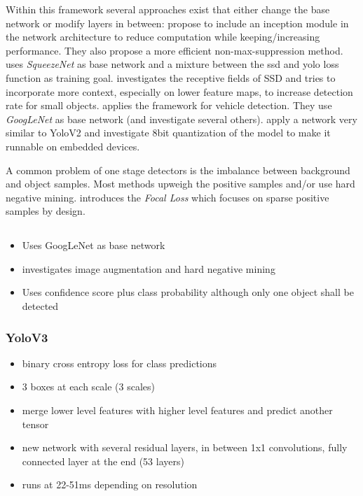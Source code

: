 	Within this framework several approaches exist that either change the base network or modify layers in between: \cite{ChengchengNing2017} propose to include an inception module in the network architecture to reduce computation while keeping/increasing performance. They also propose a more efficient non-max-suppression method. \cite{Wu} uses \textit{SqueezeNet} as base network and a mixture between the ssd and yolo loss function as training goal. \cite{Xiang} investigates the receptive fields of SSD and tries to incorporate more context, especially on lower feature maps, to increase detection rate for small objects.\cite{Linb} applies the framework for vehicle detection. They use \textit{GoogLeNet} as base network (and investigate several others).\cite{TripathiSanDiego} apply a network very similar to YoloV2 and investigate 8bit quantization of the model to make it runnable on embedded devices.
	
	A common problem of one stage detectors is the imbalance between background and object samples. Most methods upweigh the positive samples and/or use hard negative mining. \cite{Lin} introduces the \textit{Focal Loss} which focuses on sparse positive samples by design.
	

	
	\subsection{\cite{Linb}}
	
	\begin{itemize}
		\item Uses GoogLeNet as base network
		\item investigates image augmentation and hard negative mining
		\item Uses confidence score plus class probability although only one object shall be detected
	\end{itemize}
		
	\subsubsection{YoloV3 \cite{Redmona}}
	\begin{itemize}
		\item binary cross entropy loss for class predictions
		\item 3 boxes at each scale (3 scales)
		\item merge lower level features with higher level features and predict another tensor
		\item new network with several residual layers, in between 1x1 convolutions, fully connected layer at the end (53 layers)
		\item runs at 22-51ms depending on resolution
	\end{itemize}

